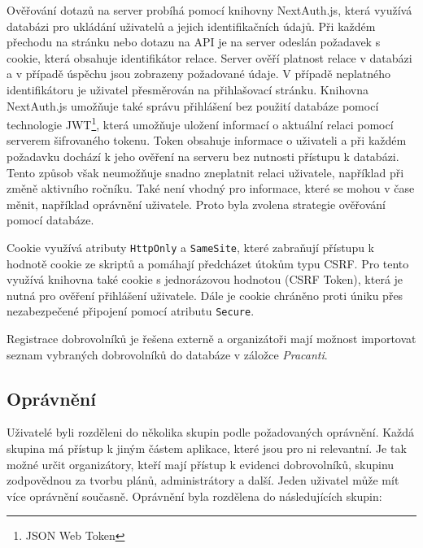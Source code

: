Ověřování dotazů na server probíhá pomocí knihovny NextAuth.js, která využívá databázi pro ukládání uživatelů a jejich identifikačních údajů. Při každém přechodu na stránku
nebo dotazu na API je na server odeslán požadavek s cookie, která obsahuje identifikátor relace. Server ověří platnost relace v databázi a v případě úspěchu jsou zobrazeny
požadované údaje. V případě neplatného identifikátoru je uživatel přesměrován na přihlašovací stránku. Knihovna NextAuth.js umožňuje také správu přihlášení bez použití databáze pomocí
technologie JWT\footnote{JSON Web Token}, která umožňuje uložení informací o aktuální relaci pomocí serverem šifrovaného tokenu. Token obsahuje informace o uživateli 
a při každém požadavku dochází k jeho ověření na serveru bez nutnosti přístupu k databázi. Tento způsob však neumožňuje snadno zneplatnit relaci uživatele, například při změně aktivního ročníku.
Také není vhodný pro informace, které se mohou v čase měnit, například oprávnění uživatele. Proto byla zvolena strategie ověřování pomocí databáze.

Cookie využívá atributy \texttt{HttpOnly} a \texttt{SameSite}, které zabraňují přístupu k hodnotě cookie ze skriptů a
pomáhají předcházet útokům typu CSRF. Pro tento využívá knihovna také cookie s jednorázovou hodnotou (CSRF Token), která je nutná pro ověření přihlášení uživatele.
Dále je cookie chráněno proti úniku přes nezabezpečené připojení pomocí atributu \texttt{Secure}. 

Registrace dobrovolníků je řešena externě a organizátoři mají možnost importovat seznam vybraných dobrovolníků do databáze v záložce \textit{Pracanti}.

\subsection{Oprávnění}

Uživatelé byli rozděleni do několika skupin podle požadovaných oprávnění. Každá skupina má přístup k jiným částem aplikace, které jsou pro ni relevantní.
Je tak možné určit organizátory, kteří mají přístup k evidenci dobrovolníků, skupinu zodpovědnou za tvorbu plánů, administrátory a další.
Jeden uživatel může mít více oprávnění současně.
Oprávnění byla rozdělena do následujících skupin:

